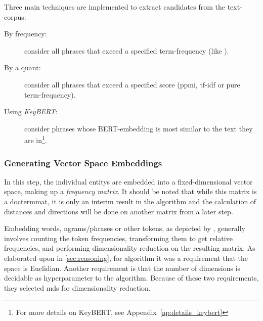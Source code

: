 Three main techniques are implemented to extract candidates from the text-corpus: 
\begin{description}
	\item[By frequency:] consider all phrases that exceed a specified term-frequency (like \cite{Derrac2015}).
	\item[By a \gls{quant}:] consider all phrases that exceed a specified score (\gls{ppmi}, \gls{tf-idf} or pure term-frequency).
	\item[Using \emph{KeyBERT}\cite{grootendorst2020keybert}:] consider phrases whose BERT-embedding \cite{Devlin2019} is most similar to the text they are in\footnote{For more details on KeyBERT, see Appendix~\ref{ap:details_keybert}}.
\end{description}



\subsubsection{Generating Vector Space Embeddings}

\label{sec:generate_vectorspaces}

In this step, the individual \glspl{entity} are embedded into a fixed-dimensional vector space, making up a \emph{frequency matrix}. It should be noted that while this matrix is a \gls{doctermmat}, it is only an interim result in the algorithm and the calculation of distances and directions will be done on another matrix from a later step.

Embedding words, \glspl{ngram}/phrases or other tokens, as depicted by \cite{Turney2010,Lowe}, generally involves counting the token frequencies, transforming them to get relative frequencies, and performing dimensionality reduction on the resulting matrix. As elaborated upon in \autoref{sec:reasoning}, for  algorithm it was a requirement that the space is Euclidian. Another requirement is that the number of dimensions is decidable as hyperparameter to the algorithm. Because of these two requirements, they selected \gls{mds} for dimensionality reduction.

